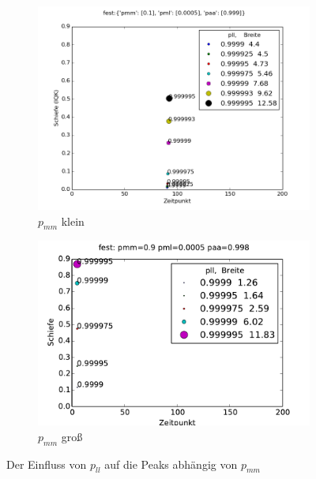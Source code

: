 \begin{figure}
\begin{subfigure}[b]{0.8\textwidth}
\includegraphics[width=\textwidth]{bilder/pll/3fest_01_00005_0999_p}
\caption{$p_{mm}$ klein}
\end{subfigure}
\begin{subfigure}[b]{0.8\textwidth}
\includegraphics[width=\textwidth]{bilder/pll/3fest_09_00005_0999_p}
\caption{$p_{mm}$ groß}
\end{subfigure}
\caption{Der Einfluss von $p_{ll}$ auf die Peaks abhängig von $p_{mm}$}
\label{einfluss_pll_pmm}
\end{figure}

